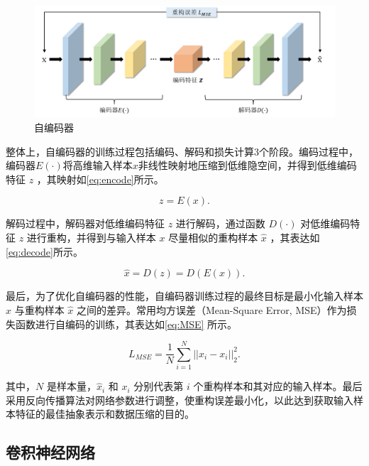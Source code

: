 \documentclass[lang=chs, degree=master, blindreview=false, adobe=false]{yanputhesis}
\begin{document}
\begin{figure}[htb]
	\centering
	\includegraphics[width=0.9\linewidth]{figs/自编码器.png}
	\caption{自编码器}
	\label{fig:AE}
\end{figure}

整体上，自编码器的训练过程包括编码、解码和损失计算3个阶段。编码过程中，编码器$E(\cdot)$将高维输入样本$x$非线性映射地压缩到低维隐空间，并得到低维编码特征 $z$ ，其映射如\autoref{eq:encode}所示。

\begin{equation}
    \label{eq:encode}
    z = E(x).
\end{equation}

解码过程中，解码器对低维编码特征 $z$ 进行解码，通过函数 $D(\cdot)$ 对低维编码特征 $z$ 进行重构，并得到与输入样本 $x$ 尽量相似的重构样本 $\hat{x}$ ，其表达如\autoref{eq:decode}所示。

\begin{equation}
    \label{eq:decode}
    \hat{x}=D(z)=D(E(x)).
\end{equation}

最后，为了优化自编码器的性能，自编码器训练过程的最终目标是最小化输入样本 $x$ 与重构样本 $\hat{x}$ 之间的差异。常用均方误差（Mean-Square Error, MSE）作为损失函数进行自编码的训练，其表达如\autoref{eq:MSE} 所示。

\begin{equation}
    \label{eq:MSE}
    L_{MSE}=\frac{1}{N}\sum_{i=1}^{N}\vert\vert\hat{x}_i-x_i\vert\vert_2^2.
\end{equation}

其中，$N$ 是样本量，$\hat{x}_i$ 和 $x_i$ 分别代表第 $i$ 个重构样本和其对应的输入样本。最后采用反向传播算法\cite{lecun2012efficient}对网络参数进行调整，使重构误差最小化，以此达到获取输入样本特征的最佳抽象表示和数据压缩的目的。

\subsection{卷积神经网络}
\end{document}
